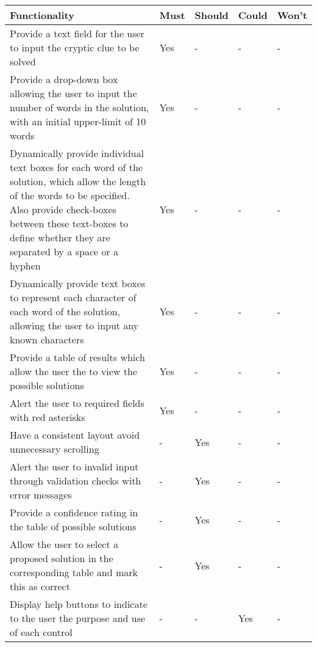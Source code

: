 \begin{table}[H]
  \centering
  \small
    \begin{tabular}{|p{9.3cm}|p{1.3cm}|p{1.3cm}|p{1.3cm}|p{1.3cm}|}
    \hline
    \textbf{Functionality} & \textbf{Must} & \textbf{Should} & \textbf{Could} & \textbf{Won't} \\ \hline

    Provide a text field for the user to input the cryptic clue to be solved &
    Yes & - & - & - \\ \hline

    Provide a drop-down box allowing the user to input the number of words in the solution, with an initial upper-limit of 10 words &
    Yes & - & - & - \\ \hline

    Dynamically provide individual text boxes for each word of the solution, which allow the length of the words to be specified. Also provide check-boxes between these text-boxes to define whether they are separated by a space or a hyphen &
    Yes & - & - & - \\ \hline

    Dynamically provide text boxes to represent each character of each word of the solution, allowing the user to input any known characters &
    Yes & - & - & - \\ \hline

    Provide a table of results which allow the user the to view the possible solutions &
    Yes & - & - & - \\ \hline

    Alert the user to required fields with red asterisks &
    Yes & - & - & - \\ \hline

    Have a consistent layout avoid unnecessary scrolling &
    - & Yes & - & - \\ \hline

    Alert the user to invalid input through validation checks with error messages &
    - & Yes & - & - \\ \hline

    Provide a confidence rating in the table of possible solutions &
    - & Yes & - & - \\ \hline

    Allow the user to select a proposed solution in the corresponding table and mark this as correct &
    - & Yes & - & - \\ \hline

    Display help buttons to indicate to the user the purpose and use of each control &
    - & - & Yes & - \\ \hline


\end{tabular}
\end{table}
